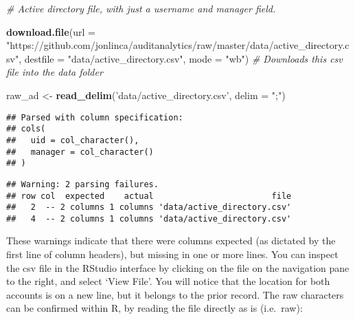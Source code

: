 \documentclass[
]{book}
\newenvironment{Shaded}{\begin{snugshade}}{\end{snugshade}}
\newcommand{\CommentTok}[1]{\textcolor[rgb]{0.56,0.35,0.01}{\textit{#1}}}
\newcommand{\DataTypeTok}[1]{\textcolor[rgb]{0.13,0.29,0.53}{#1}}
\newcommand{\KeywordTok}[1]{\textcolor[rgb]{0.13,0.29,0.53}{\textbf{#1}}}
\newcommand{\NormalTok}[1]{#1}
\newcommand{\OperatorTok}[1]{\textcolor[rgb]{0.81,0.36,0.00}{\textbf{#1}}}
\newcommand{\StringTok}[1]{\textcolor[rgb]{0.31,0.60,0.02}{#1}}
\begin{document}
\begin{Shaded}
\begin{Highlighting}[]
\CommentTok{# Active directory file, with just a username and manager field.}

\KeywordTok{download.file}\NormalTok{(}\DataTypeTok{url =} \StringTok{"https://github.com/jonlinca/auditanalytics/raw/master/data/active_directory.csv"}\NormalTok{,}
              \DataTypeTok{destfile =} \StringTok{"data/active_directory.csv"}\NormalTok{, }\DataTypeTok{mode =} \StringTok{"wb"}\NormalTok{) }\CommentTok{# Downloads this csv file into the data folder}

\NormalTok{raw_ad <-}\StringTok{ }\KeywordTok{read_delim}\NormalTok{(}\StringTok{'data/active_directory.csv'}\NormalTok{, }\DataTypeTok{delim =} \StringTok{";"}\NormalTok{)}
\end{Highlighting}
\end{Shaded}

\begin{verbatim}
## Parsed with column specification:
## cols(
##   uid = col_character(),
##   manager = col_character()
## )
\end{verbatim}

\begin{verbatim}
## Warning: 2 parsing failures.
## row col  expected    actual                        file
##   2  -- 2 columns 1 columns 'data/active_directory.csv'
##   4  -- 2 columns 1 columns 'data/active_directory.csv'
\end{verbatim}

These warnings indicate that there were columns expected (as dictated by the first line of column headers), but missing in one or more lines. You can inspect the csv file in the RStudio interface by clicking on the file on the navigation pane to the right, and select `View File'. You will notice that the location for both accounts is on a new line, but it belongs to the prior record. The raw characters can be confirmed within R, by reading the file directly as is (i.e.~raw):

\begin{Shaded}
\end{Shaded}
\end{document}
